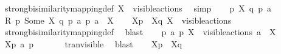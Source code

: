 \begin{isabellebody}
\ strong{\isacharunderscore}{\kern0pt}bisimilarity{\isacharunderscore}{\kern0pt}mapping{\isacharunderscore}{\kern0pt}def\ {\isacartoucheopen}X\ {\isasymsubseteq}\ visible{\isacharunderscore}{\kern0pt}actions{\isacartoucheclose}\ \isamarkupfalse%
\ simp\isanewline
{}\isamarkupfalse%
\isanewline
\ \ \isamarkupfalse%
\ p\ X\ q\ p{\isacharprime}{\kern0pt}\ a\isanewline
\ \ \isamarkupfalse%
\ {\isacartoucheopen}{\isacharquery}{\kern0pt}R\ p\ {\isacharparenleft}{\kern0pt}Some\ X{\isacharparenright}{\kern0pt}\ q{\isacartoucheclose}\ {\isacartoucheopen}p\ {\isasymlongmapsto}a\ p{\isacharprime}{\kern0pt}{\isacartoucheclose}\ {\isacartoucheopen}a\ {\isasymin}\ X{\isacartoucheclose}\isanewline
\ \ \isamarkupfalse%
\ {\isacartoucheopen}{\isasymtheta}{\isacharbrackleft}{\kern0pt}X{\isacharbrackright}{\kern0pt}{\isacharparenleft}{\kern0pt}p{\isacharparenright}{\kern0pt}\ {\isasymleftrightarrow}\ {\isasymtheta}{\isacharbrackleft}{\kern0pt}X{\isacharbrackright}{\kern0pt}{\isacharparenleft}{\kern0pt}q{\isacharparenright}{\kern0pt}{\isacartoucheclose}\ {\isacartoucheopen}X\ {\isasymsubseteq}\ visible{\isacharunderscore}{\kern0pt}actions{\isacartoucheclose}\ \isamarkupfalse%
\ strong{\isacharunderscore}{\kern0pt}bisimilarity{\isacharunderscore}{\kern0pt}mapping{\isacharunderscore}{\kern0pt}def\ \isamarkupfalse%
\ blast{\isacharplus}{\kern0pt}\isanewline
\ \ \isamarkupfalse%
\ {\isacartoucheopen}p\ {\isasymlongmapsto}a\ p{\isacharprime}{\kern0pt}{\isacartoucheclose}\ {\isacartoucheopen}X\ {\isasymsubseteq}\ visible{\isacharunderscore}{\kern0pt}actions{\isacartoucheclose}\ {\isacartoucheopen}a\ {\isasymin}\ X{\isacartoucheclose}\ \isamarkupfalse%
\ {\isacartoucheopen}{\isasymtheta}{\isacharbrackleft}{\kern0pt}X{\isacharbrackright}{\kern0pt}{\isacharparenleft}{\kern0pt}p{\isacharparenright}{\kern0pt}\ {\isasymlongmapsto}\isactrlsup {\isasymtheta}a\ {\isasymtheta}{\isacharparenleft}{\kern0pt}p{\isacharprime}{\kern0pt}{\isacharparenright}{\kern0pt}{\isacartoucheclose}\ \isanewline
\ \ \ \ \isamarkupfalse%
\ tran{\isacharunderscore}{\kern0pt}visible\ \isamarkupfalse%
\ blast\isanewline
\ \ \isamarkupfalse%
\ {\isacartoucheopen}{\isasymtheta}{\isacharbrackleft}{\kern0pt}X{\isacharbrackright}{\kern0pt}{\isacharparenleft}{\kern0pt}p{\isacharparenright}{\kern0pt}\ {\isasymleftrightarrow}\ {\isasymtheta}{\isacharbrackleft}{\kern0pt}X{\isacharbrackright}{\kern0pt}{\isacharparenleft}{\kern0pt}q{\isacharparenright}{\kern0pt}{\isacartoucheclose}\ \isamarkupfalse%

\end{isabellebody}

